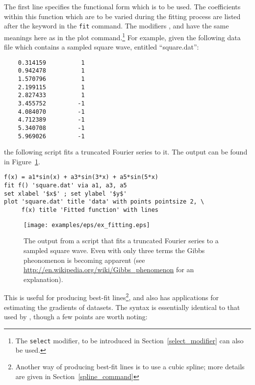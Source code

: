The first line specifies the functional form which is to be used.  The
coefficients within this function which are to be varied during the fitting
process are listed after the keyword  in the {\tt fit} command.
The modifiers ,  and
 have the same meanings here as in the plot
command.\footnote{The {\tt select} modifier, to be introduced in
Section~\ref{select_modifier} can also be used.}  For example, given the
following data file which contains a sampled square wave, entitled
``square.dat'':

\begin{verbatim}
    0.314159          1
    0.942478          1
    1.570796          1
    2.199115          1
    2.827433          1
    3.455752         -1
    4.084070         -1
    4.712389         -1
    5.340708         -1
    5.969026         -1
\end{verbatim}

\noindent the following script fits a truncated Fourier series to it.  The
output can be found in Figure~\ref{fig:ex_fitting}.

\begin{verbatim}
f(x) = a1*sin(x) + a3*sin(3*x) + a5*sin(5*x)
fit f() 'square.dat' via a1, a3, a5
set xlabel '$x$' ; set ylabel '$y$'
plot 'square.dat' title 'data' with points pointsize 2, \
     f(x) title 'Fitted function' with lines
\end{verbatim}

\begin{figure}
\begin{center}
\texttt{[image: examples/eps/ex\_fitting.eps]}
\end{center}
\caption[The output from a script that fits a truncated Fourier series to a
sampled square wave]{The output from a script that fits a truncated Fourier series to a
sampled square wave.  Even with only three terms the Gibbs pheonomenon is
becoming apparent (see \protect\url{http://en.wikipedia.org/wiki/Gibbs_phenomenon} for
an explanation).} 
\label{fig:ex_fitting}
\end{figure}


This is useful for producing best-fit lines\footnote{Another way of producing best-fit lines is to use a cubic
spline; more details are given in Section~\ref{spline_command}}, and also has
applications for estimating the gradients of datasets.  The syntax is
essentially identical to that used by \gnuplot, though a few points are worth
noting:

